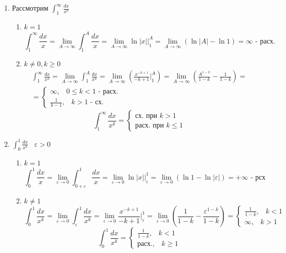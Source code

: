 \documentclass[12pt]{article}
\begin{document}
    \begin{enumerate}
        \item Рассмотрим $\int_{1}^{\infty}\frac{dx}{x^k}$
        \begin{enumerate}
            \item $k=1$
            \[ \int_{1}^{\infty}\frac{dx}{x}=\lim_{A \to \infty}\int_{1}^{A} \frac{dx}{x}=\lim_{A \to \infty} \ln |x|\Big|^A_1 = \lim_{A \to \infty}(\ln |A|-\ln 1)=\infty \text{ - расх.} \]
            \item $k \ne 0, k \geq 0$ 
            \begin{gather*}
                \int_{1}^{\infty} \frac{dx}{x^k}=\lim_{A \to \infty}\int_{1}^{A} \frac{dx}{x^k}=\lim_{A \to \infty} (\frac{x^{-k+1}}{-k+1}\Big|^A_1)=\lim_{A \to \infty}
                (\frac{A^{1-k}}{1-k}-\frac{1}{1-k}) =\\
                = \begin{cases}
                    \infty, \;\;\; 0\leq k<1 \text{ - расх.}\\
                    \frac{1}{k-1}, \;\;\; k>1\text{ - сх.}
                \end{cases} 
            \end{gather*}
            \[ \int_{1}^{\infty}\frac{dx}{x^k}=\begin{cases}
                \text{сх. при }k>1\\
                \text{расх. при }k \leq 1
            \end{cases} \]
        \end{enumerate}
        \item $\int_{0}^{1} \frac{dx}{x^k} \;\;\; \varepsilon>0$
        \begin{enumerate}
            \item $k=1$ 
            \[ \int_{0}^{1} \frac{dx}{x}=\lim_{\varepsilon \to 0}\int_{0+\varepsilon}^{1}\frac{dx}{x}=\lim_{\varepsilon \to 0}\ln |x|\Big|^1_\varepsilon =\lim_{\varepsilon \to 0}(\ln 1-\ln |\varepsilon|)=+\infty \text{ - рсх} \]
            \item $k\ne 1$ 
            \[ \int_{0}^{1} \frac{dx}{x^k} = \lim_{\varepsilon \to 0}\int_{\varepsilon}^{1}\frac{dx}{x^k}=\lim_{\varepsilon \to 0}\frac{x^{-k+1}}{-k+1}\Big|^1_\varepsilon =\lim_{\varepsilon \to 0}
            (\frac{1}{1-k}-\frac{\varepsilon^{1-k}}{1-k})=\begin{cases}
                \frac{1}{1-k}, \;\;\; k<1\\
                \infty, \;\;\; k>1
            \end{cases} \]
            \[ \int_{0}^{1}\frac{dx}{x^k} = \begin{cases}
                \frac{1}{1-k}, \;\;\; k<1\\
                \text{расх.}, \;\;\; k\geq 1
            \end{cases} \]
        \end{enumerate}
    \end{enumerate}
\end{document}
